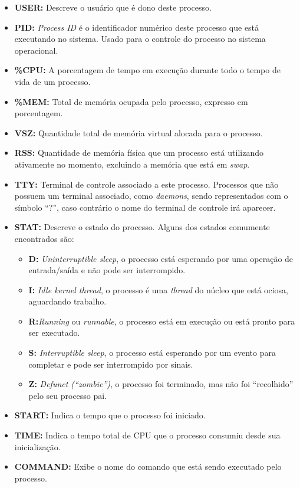 \documentclass[
	12pt,				%
	oneside,   	        %
	a4paper,			%
	english,			%
	french,				%
	spanish,			%
	brazil,				%
	]{pacotes/abntex2}
\begin{document}
\begin{itemize}
    \item \textbf{USER:} Descreve o usuário que é dono deste processo.
    
    \item \textbf{PID:} \textit{Process ID} é o identificador numérico deste processo que está executando no sistema. Usado para o controle do processo no sistema operacional.

    \item \textbf{\%CPU:} A porcentagem de tempo em execução durante todo o tempo de vida de um processo.
    
    \item \textbf{\%MEM:} Total de memória ocupada pelo processo, expresso em porcentagem.
    
    \item \textbf{VSZ:} Quantidade total de memória virtual alocada para o processo.
    
    \item \textbf{RSS:} Quantidade de memória física que um processo está utilizando ativamente no momento, excluindo a memória que está em \textit{swap}.
    
    \item \textbf{TTY:} Terminal de controle associado a este processo. Processos que não possuem um terminal associado, como \textit{daemons}, sendo representados com o símbolo ``?'', caso contrário o nome do terminal de controle irá aparecer.
    
    \item \textbf{STAT:} Descreve o estado do processo. Alguns dos estados comumente encontrados são:
    
    \begin{itemize}
        \item \textbf{D:} \textit{Uninterruptible sleep}, o processo está esperando por uma operação de entrada/saída e não pode ser interrompido.
        \item \textbf{I:} \textit{Idle kernel thread}, o processo é uma \textit{thread} do núcleo que está ociosa, aguardando trabalho.
        \item \textbf{R:}\textit{Running} ou \textit{runnable}, o processo está em execução ou está pronto para ser executado.
        \item \textbf{S:} \textit{Interruptible sleep}, o processo está esperando por um evento para completar e pode ser interrompido por sinais.
        \item \textbf{Z:} \textit{Defunct (``zombie'')}, o processo foi terminado, mas não foi ``recolhido'' pelo seu processo pai.
    \end{itemize}
    
    \item \textbf{START:} Indica o tempo que o processo foi iniciado.
    
    \item \textbf{TIME:} Indica o tempo total de CPU que o processo consumiu desde sua inicialização.
    
    \item \textbf{COMMAND:} Exibe o nome do comando que está sendo executado pelo processo. 
\end{itemize}
    
\end{document}
